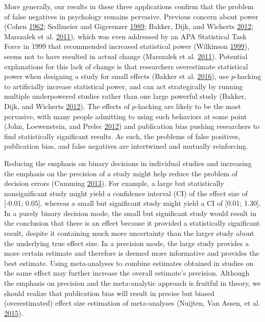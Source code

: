 \documentclass[a5paper]{book}
\begin{document}
More generally, our results in these three applications confirm that the
problem of false negatives in psychology remains pervasive. Previous
concern about power (Cohen
\protect\hyperlink{ref-doi:10.1037ux2fh0045186}{1962}; Sedlmeier and
Gigerenzer
\protect\hyperlink{ref-doi:10.1037ux2f0033-2909.105.2.309}{1989};
Bakker, Dijk, and Wicherts
\protect\hyperlink{ref-doi:10.1177ux2f1745691612459060}{2012}; Marszalek
et al.
\protect\hyperlink{ref-doi:10.2466ux2f03.11.pms.112.2.331-348}{2011}),
which was even addressed by an APA Statistical Task Force in 1999 that
recommended increased statistical power (Wilkinson
\protect\hyperlink{ref-doi:10.1037ux2f0003-066x.54.8.594}{1999}), seems
not to have resulted in actual change (Marszalek et al.
\protect\hyperlink{ref-doi:10.2466ux2f03.11.pms.112.2.331-348}{2011}).
Potential explanations for this lack of change is that researchers
overestimate statistical power when designing a study for small effects
(Bakker et al.
\protect\hyperlink{ref-doi:10.1177ux2f0956797616647519}{2016}), use
\(p\)-hacking to artificially increase statistical power, and can act
strategically by running multiple underpowered studies rather than one
large powerful study (Bakker, Dijk, and Wicherts
\protect\hyperlink{ref-doi:10.1177ux2f1745691612459060}{2012}). The
effects of \(p\)-hacking are likely to be the most pervasive, with many
people admitting to using such behaviors at some point (John,
Loewenstein, and Prelec
\protect\hyperlink{ref-doi:10.1177ux2f0956797611430953}{2012}) and
publication bias pushing researchers to find statistically significant
results. As such, the problems of false positives, publication bias, and
false negatives are intertwined and mutually reinforcing.

Reducing the emphasis on binary decisions in individual studies and
increasing the emphasis on the precision of a study might help reduce
the problem of decision errors (Cumming
\protect\hyperlink{ref-doi:10.1177ux2f0956797613504966}{2013}). For
example, a large but statistically nonsignificant study might yield a
confidence interval (CI) of the effect size of {[}-0.01; 0.05{]},
whereas a small but significant study might yield a CI of {[}0.01;
1.30{]}. In a purely binary decision mode, the small but significant
study would result in the conclusion that there is an effect because it
provided a statistically significant result, despite it containing much
more uncertainty than the larger study about the underlying true effect
size. In a precision mode, the large study provides a more certain
estimate and therefore is deemed more informative and provides the best
estimate. Using meta-analyses to combine estimates obtained in studies
on the same effect may further increase the overall estimate's
precision. Although the emphasis on precision and the meta-analytic
approach is fruitful in theory, we should realize that publication bias
will result in precise but biased (overestimated) effect size estimation
of meta-analyses (Nuijten, Van Assen, et al.
\protect\hyperlink{ref-doi:10.1037ux2fgpr0000034}{2015}).
\end{document}
